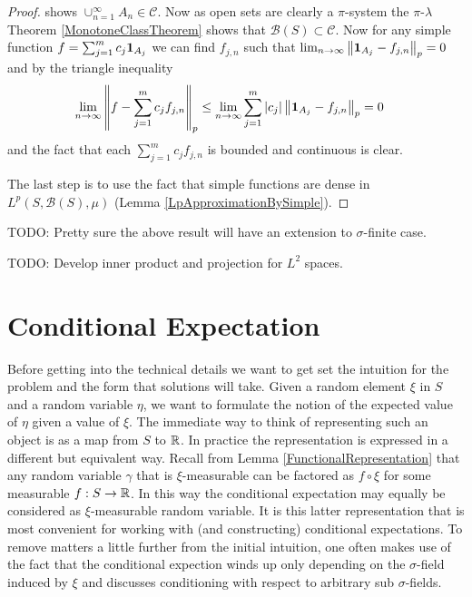 \begin{proof}
shows $\cup_{n=1}^\infty A_n \in \mathcal{C}$.  Now as open sets are
clearly a $\pi$-system the
$\pi$-$\lambda$ Theorem \ref{MonotoneClassTheorem} shows that
$\mathcal{B}(S) \subset \mathcal{C}$.  Now for any simple function $f
= \sum_{j=1}^m c_j \textbf{1}_{A_j}$ we can find $f_{j,n}$ such
that $\lim_{n \to \infty} \left \lVert \textbf{1}_{A_j} - f_{j,n} \right \rVert_p = 0$
and by the triangle inequality
\begin{align*}
\lim_{n \to \infty} \left \lVert f - \sum_{j=1}^m c_j f_{j,n} \right \rVert_p &\leq
\lim_{n \to \infty} \sum_{j=1}^m \left \vert c_j \right \vert \left \lVert \textbf{1}_{A_j}
  - f_{j,n} \right \rVert_p = 0
\end{align*}
and the fact that each $\sum_{j=1}^m c_j f_{j,n}$ is bounded and continuous is clear.

The last step is to use the fact that simple functions are dense in
$L^p(S, \mathcal{B}(S), \mu)$ (Lemma \ref{LpApproximationBySimple}).
\end{proof}

TODO: Pretty sure the above result will have an extension to
$\sigma$-finite case.

TODO: Develop inner product and projection for $L^2$ spaces.

\section{Conditional Expectation}
 Before getting into the technical details we want to get set the
intuition for the problem and the form that solutions will take.
Given a random element $\xi$ in $S$ and a random variable $\eta$, we want to
formulate the notion of the expected value of $\eta$ given a value of
$\xi$.  The immediate way to think of representing such an object is as a map from
$S$ to $\mathbb{R}$.  In practice the representation is expressed in a
different but equivalent way.  Recall from Lemma
\ref{FunctionalRepresentation} that any random variable
$\gamma$ that is $\xi$-measurable can be factored as $f \circ
\xi$ for some measurable $f : S \to \mathbb{R}$.  In this way the
conditional expectation may equally be considered as $\xi$-measurable
random variable.  It is this latter representation that is most
convenient for working with (and constructing) conditional
expectations.  To remove matters a little further from the initial
intuition, one often makes use of the fact that the conditional
expection winds up only depending on the $\sigma$-field induced by
$\xi$ and discusses conditioning with respect to arbitrary sub
$\sigma$-fields.

